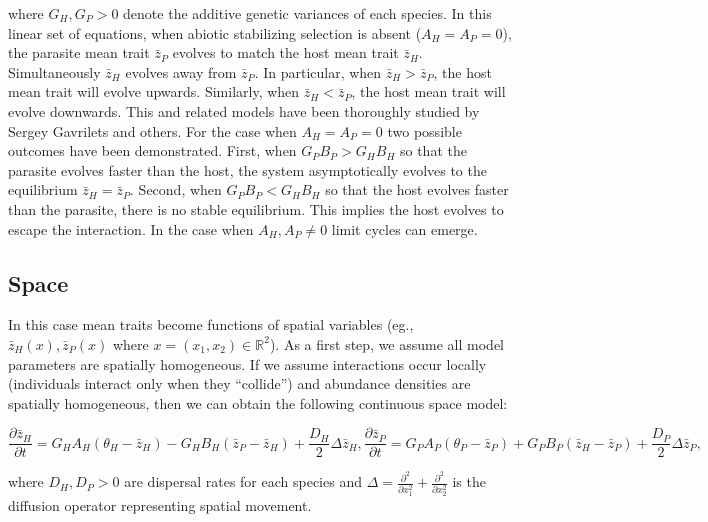 \documentclass{article}
\begin{document}
where \(G_H,G_P>0\) denote the additive genetic variances of each
species. In this linear set of equations, when abiotic stabilizing
selection is absent (\(A_H=A_P=0\)), the parasite mean trait
\(\bar z_P\) evolves to match the host mean trait \(\bar z_H\).
Simultaneously \(\bar z_H\) evolves away from \(\bar z_P\). In
particular, when \(\bar z_H>\bar z_P\), the host mean trait will evolve
upwards. Similarly, when \(\bar z_H<\bar z_P\), the host mean trait will
evolve downwards. This and related models have been thoroughly studied
by Sergey Gavrilets and others. For the case when \(A_H=A_P=0\) two
possible outcomes have been demonstrated. First, when \(G_PB_P>G_HB_H\)
so that the parasite evolves faster than the host, the system
asymptotically evolves to the equilibrium \(\bar z_H=\bar z_P\). Second,
when \(G_PB_P<G_HB_H\) so that the host evolves faster than the
parasite, there is no stable equilibrium. This implies the host evolves
to escape the interaction. In the case when \(A_H,A_P\neq0\) limit
cycles can emerge.

\hypertarget{space}{%
\subsection{Space}\label{space}}

In this case mean traits become functions of spatial variables (eg.,
\(\bar z_H(x),\bar z_P(x)\) where \(x=(x_1,x_2)\in\mathbb R^2\)). As a
first step, we assume all model parameters are spatially homogeneous. If
we assume interactions occur locally (individuals interact only when
they \enquote{collide}) and abundance densities are spatially
homogeneous, then we can obtain the following continuous space model:

\begin{subequations}\label{deterministic}
  \begin{equation}
    \frac{\partial\bar z_H}{\partial t}=G_HA_H(\theta_H-\bar z_H)-G_HB_H(\bar z_P-\bar z_H)+\frac{D_H}{2}\Delta\bar z_H,
  \end{equation}
  \begin{equation}
    \frac{\partial\bar z_P}{\partial t}=G_PA_P(\theta_P-\bar z_P)+G_PB_P(\bar z_H-\bar z_P)+\frac{D_P}{2}\Delta\bar z_P,
  \end{equation}
\end{subequations}

where \(D_H,D_P>0\) are dispersal rates for each species and
\(\Delta=\frac{\partial^2}{\partial x_1^2}+\frac{\partial^2}{\partial x_2^2}\)
is the diffusion operator representing spatial movement.
\end{document}
